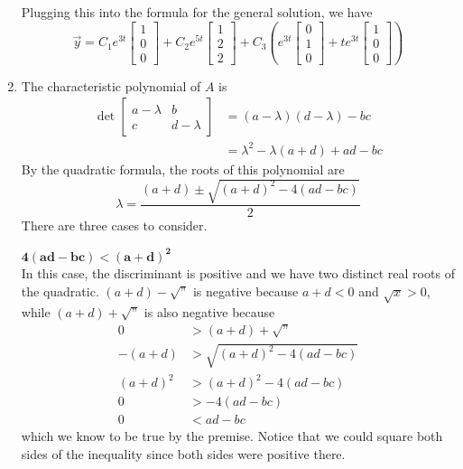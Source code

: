 \documentclass[12pt]{article}
\begin{document}
\begin{enumerate}
          Plugging this into the formula for the general solution, we have
          \[\vec{y}=C_1e^{3t}\begin{bmatrix}
            1 \\ 0 \\ 0
          \end{bmatrix}+C_2e^{5t}\begin{bmatrix}
            1 \\ 2 \\ 2
          \end{bmatrix}+C_3\left(e^{3t}\begin{bmatrix}
            0 \\ 1 \\ 0
          \end{bmatrix}+te^{3t}\begin{bmatrix}
            1 \\ 0 \\ 0
          \end{bmatrix}\right)\]

    \item The characteristic polynomial of $A$ is
          \begin{align*}
              \det \begin{bmatrix}
                       a-\lambda & b         \\
                       c         & d-\lambda
                   \end{bmatrix} & = (a-\lambda)(d-\lambda)-bc          \\
                                       & = \lambda^2-\lambda(a+d)+ad-bc
          \end{align*}
          By the quadratic formula, the roots of this polynomial are
          \[\lambda=\frac{(a+d) \pm \sqrt{(a+d)^2-4(ad-bc)}}{2}\]
          There are three cases to consider.

          $\mathbf{4(ad-bc) < (a+d)^2}$ \\
          In this case, the discriminant is positive and we have two distinct real
          roots of the quadratic.
          $(a+d)-\sqrt{\text{''}}$ is negative because $a+d<0$ and $\sqrt{x}>0$,
          while $(a+d)+\sqrt{\text{''}}$ is also negative because
          \begin{align*}
              0       & >(a+d)+\sqrt{\text{''}}   \\
              -(a+d)  & > \sqrt{(a+d)^2-4(ad-bc)} \\
              (a+d)^2 & > (a+d)^2-4(ad-bc)        \\
              0       & > -4(ad-bc)               \\
              0       & < ad-bc
          \end{align*}
          which we know to be true by the premise.
          Notice that we could square both sides of the inequality since both sides
          were positive there.


\end{enumerate}
\end{document}
